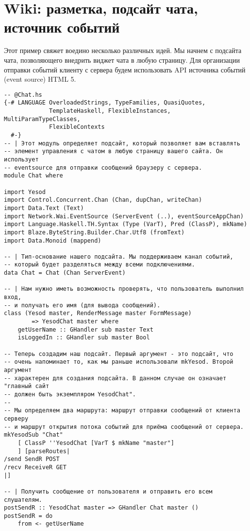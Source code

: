 
\chapter{Wiki: разметка, подсайт чата, источник событий}
\label{}

Этот пример свяжет воедино несколько различных идей. Мы начнем с подсайта чата, позволяющего внедрить виджет чата в любую страницу. Для организации отправки событий клиенту с сервера будем использовать API источника событий (event source) HTML 5.

\begin{lstlisting}
-- @Chat.hs
{-# LANGUAGE OverloadedStrings, TypeFamilies, QuasiQuotes,
             TemplateHaskell, FlexibleInstances, MultiParamTypeClasses,
             FlexibleContexts
  #-}
-- | Этот модуль определяет подсайт, который позволяет вам вставлять
-- элемент управления с чатом в любую страницу вашего сайта. Он использует
-- eventsource для отправки сообщений браузеру с сервера.
module Chat where

import Yesod
import Control.Concurrent.Chan (Chan, dupChan, writeChan)
import Data.Text (Text)
import Network.Wai.EventSource (ServerEvent (..), eventSourceAppChan)
import Language.Haskell.TH.Syntax (Type (VarT), Pred (ClassP), mkName)
import Blaze.ByteString.Builder.Char.Utf8 (fromText)
import Data.Monoid (mappend)

-- | Тип-основание нашего подсайта. Мы поддерживаем канал событий,
-- который будет разделяться между всеми подключениями.
data Chat = Chat (Chan ServerEvent)

-- | Нам нужно иметь возможность проверять, что пользователь выполнил вход,
-- и получать его имя (для вывода сообщений).
class (Yesod master, RenderMessage master FormMessage)
        => YesodChat master where
    getUserName :: GHandler sub master Text
    isLoggedIn :: GHandler sub master Bool

-- Теперь создадим наш подсайт. Первый аргумент - это подсайт, что
-- очень напоминает то, как мы раньше использовали mkYesod. Второй аргумент
-- характерен для создания подсайта. В данном случае он означает "главный сайт
-- должен быть экземпляром YesodChat".
--
-- Мы определяем два маршрута: маршрут отправки сообщений от клиента серверу
-- и маршрут открытия потока событий для приёма сообщений от сервера.
mkYesodSub "Chat"
    [ ClassP ''YesodChat [VarT $ mkName "master"]
    ] [parseRoutes|
/send SendR POST
/recv ReceiveR GET
|]

-- | Получить сообщение от пользователя и отправить его всем слушателям.
postSendR :: YesodChat master => GHandler Chat master ()
postSendR = do
    from <- getUserName


\end{lstlisting}
